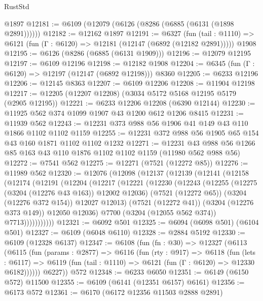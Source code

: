 \begin{lexlean}{RustStd}
\begin{coremodule}
    @1897
@12181 := @6109 (@12079 (@6126 (@8286 (@6885 (@6131 (@1898 @2891))))))
@12182 := @12162 @1897
@12191 := @6327
    (fun (tail : @1110) => @6121 (fun (Γ : @6120) => @12181 (@12147 (@6892 (@12182 @2891)))))
    @1908
@12195 := @6126 (@8286 (@6885 (@6131 @1909)))
@12196 := @12079 @12195
@12197 := @6109 @12196
@12198 := @12182 @1908
@12204 := @6345 (fun (Γ : @6120) => @12197 (@12147 (@6892 @12198))) @8360
@12205 := @6233 @12196
@12206 := @12145 @8363
@12207 := @6109 @12206
@12208 := @11904 @12198
@12217 := @12205 (@12207 @12208) (@3034 @5172 @5168 @12195 @5179 (@2905 @12195))
@12221 := @6233 @12206 @12208 (@6390 @12144)
@12230 := @11925 @562 @374 @1099 @1907 @43 @1200 @612 @1206 @8415
@12231 := @11939 @562
@12243 := @12231 @373 @988 @56 @1906 @41 @149 @43 @110 @1866 @1102 @1102 @1159
@12255 := @12231 @372 @988 @56 @1905 @65 @154 @43 @160 @1871 @1102 @1102 @1232
@12271 := @12231 @43 @988 @56 @1266 @85 @163 @43 @110 @1876 @1102 @1102 @1159 (@11980 @562 @988 @56)
@12272 := @7541 @562
@12275 := @12271 (@7521 (@12272 @85))
@12276 := @11989 @562
@12320 := @12076
    (@12098
      (@12137
        (@12139
          (@12141
            (@12158
              (@12174
                (@12191
                  (@12204
                    (@12217
                      (@12221
                        (@12230
                          (@12243
                            (@12255
                              (@12275 (@3204 (@12276 @43 @163)) @12002 @12036)
                              (@7521 (@12272 @65))
                              (@3204 (@12276 @372 @154))
                              @12027
                              @12013)
                            (@7521 (@12272 @41))
                            (@3204 (@12276 @373 @149))
                            @12050
                            @12036)
                          @7700
                          (@3204 (@12055 @562 @374))
                          @7713)))))))))))
@12321 := @6092 @501
@12325 := @6094 (@6098 @501) (@6104 @501)
@12327 := @6109 (@6048 @6110)
@12328 := @2884 @5192
@12330 := @6109 (@12328 @6137)
@12347 := @6108
    (fun (fn : @30) =>
    @12327
      (@6113
        (@6115
          (fun (params : @2877) =>
          @6116
            (fun (rty : @917) =>
            @6118
              (fun (lets : @6117) =>
              @6119 (fun (tail : @1110) => @6121 (fun (Γ : @6120) => @12330 @6182))))))
        @6227))
    @572
@12348 := @6233 @6050
@12351 := @6149 (@6150 @572) @11500
@12355 := @6109 (@6141 (@12351 @6157) @6161)
@12356 := @6173 @572
@12361 := @6170 (@6172 @12356 @11503 @2888 @2891)

\end{coremodule}
\end{lexlean}
